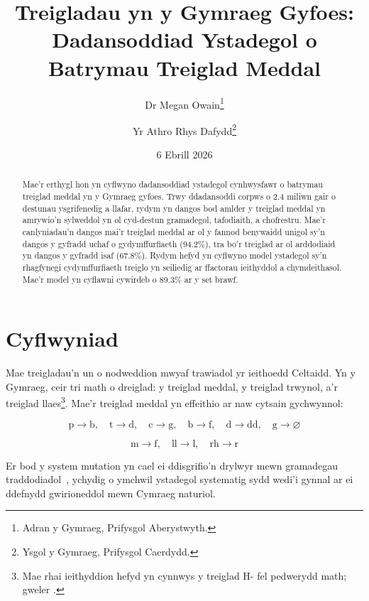 \documentclass[12pt,a4paper]{article}
\title{Treigladau yn y Gymraeg Gyfoes:\\
Dadansoddiad Ystadegol o Batrymau Treiglad Meddal}
\author{%
  Dr Megan Owain\thanks{Adran y Gymraeg, Prifysgol Aberystwyth.}
  \and
  Yr Athro Rhys Dafydd\thanks{Ysgol y Gymraeg, Prifysgol Caerdydd.}
}
\date{6 Ebrill 2026}
\begin{document}
\maketitle

\begin{abstract}
Mae'r erthygl hon yn cyflwyno dadansoddiad ystadegol cynhwysfawr o
batrymau treiglad meddal yn y Gymraeg gyfoes. Trwy ddadansoddi
corpws o 2.4 miliwn gair o destunau ysgrifenedig a llafar, rydym
yn dangos bod amlder y treiglad meddal yn amrywio'n sylweddol yn
ol cyd-destun gramadegol, tafodiaith, a chofrestru. Mae'r
canlyniadau'n dangos mai'r treiglad meddal ar ol y fannod
benywaidd unigol sy'n dangos y gyfradd uchaf o gydymffurfiaeth
(94.2\%), tra bo'r treiglad ar ol arddodiaid yn dangos y gyfradd
isaf (67.8\%). Rydym hefyd yn cyflwyno model ystadegol sy'n
rhagfynegi cydymffurfiaeth treiglo yn seiliedig ar ffactorau
ieithyddol a chymdeithasol. Mae'r model yn cyflawni cywirdeb
o 89.3\% ar y set brawf.
\end{abstract}

\tableofcontents

\section{Cyflwyniad}
\label{sec:cyflwyniad}

Mae treigladau'n un o nodweddion mwyaf trawiadol yr ieithoedd
Celtaidd. Yn y Gymraeg, ceir tri math o dreiglad: y treiglad
meddal, y treiglad trwynol, a'r treiglad llaes\footnote{%
Mae rhai ieithyddion hefyd yn cynnwys y treiglad H- fel
pedwerydd math; gweler \citet{thomas1996}.}. Mae'r treiglad
meddal yn effeithio ar naw cytsain gychwynnol:

\begin{equation}
\label{eq:treiglad_meddal}
\text{p} \to \text{b}, \quad
\text{t} \to \text{d}, \quad
\text{c} \to \text{g}, \quad
\text{b} \to \text{f}, \quad
\text{d} \to \text{dd}, \quad
\text{g} \to \varnothing
\end{equation}

\begin{equation}
\label{eq:treiglad_meddal_2}
\text{m} \to \text{f}, \quad
\text{ll} \to \text{l}, \quad
\text{rh} \to \text{r}
\end{equation}

Er bod y system mutation yn cael ei ddisgrifio'n drylwyr mewn
gramadegau traddodiadol~\citep{thomas1996, king2003}, ychydig
o ymchwil ystadegol systematig sydd wedi'i gynnal ar ei
ddefnydd gwirioneddol mewn Cymraeg naturiol.
\end{document}
